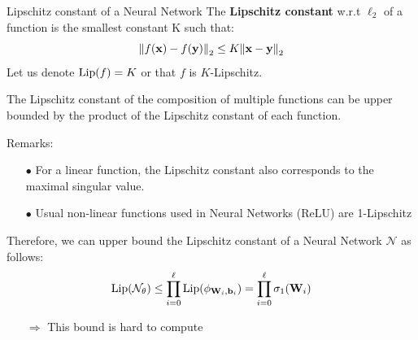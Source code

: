 %
%
%


\begin{frame}{Lipschitz constant of a Neural Network}
  The \textbf{Lipschitz constant} w.r.t $\ell_2$ of a function is the smallest constant K such that:
  \begin{equation*}
    \norm{f(\mathbf{x}) - f(\mathbf{y})}_2 \leq K \norm{\mathbf{x} - \mathbf{y}}_2
  \end{equation*}
  Let us denote $\operatorname*{Lip}(f) = K$ or that $f$ is $K$-Lipschitz.

  The Lipschitz constant of the composition of multiple functions can be upper bounded by the product of the Lipschitz constant of each function.

  Remarks:
  \begin{itemize}
    \small
    \item[$\bullet$] For a linear function, the Lipschitz constant also corresponds to the maximal singular value. 
    \item[$\bullet$] Usual non-linear functions used in Neural Networks (\eg ReLU) are 1-Lipschitz
  \end{itemize}

  Therefore, we can upper bound the Lipschitz constant of a Neural Network $\mathcal{N}$ as follows:
  \begin{equation*}
    \operatorname*{Lip}(\mathcal{N}_\theta) \leq \prod_{i=0}^\ell \operatorname*{Lip}(\phi_{\mathbf{W}_i, \mathbf{b}_i}) = \prod_{i=0}^\ell \sigma_1(\mathbf{W}_i)
  \end{equation*}

  \begin{itemize}
    \item[$\Rightarrow$] This bound is hard to compute
  \end{itemize}
 
\end{frame}




